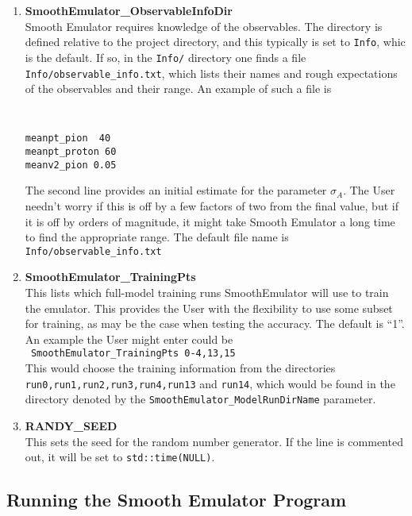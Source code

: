 \documentclass[main.tex]{subfiles}
\begin{document}
\begin{enumerate}
\item {\bf SmoothEmulator\_ObservableInfoDir}\\
Smooth Emulator requires knowledge of the observables. The directory is defined relative to the project directory, and this typically is set to {\tt Info}, whic is the default. If so, in the {\tt Info/} directory one finds a file {\tt Info/observable\_info.txt}, which lists their names and rough expectations of the observables and their range. An example of such a file is
{\tt
\begin{verbatim}
meanpt_pion  40
meanpt_proton 60
meanv2_pion 0.05
\end{verbatim}
}
The second line provides an initial estimate for the parameter $\sigma_A$. The User needn't worry if this is off by a few factors of two from the final value, but if it is off by orders of magnitude, it might take Smooth Emulator a long time to find the appropriate range. The default file name is {\tt Info/observable\_info.txt}
\item {\bf SmoothEmulator\_TrainingPts}\\
This lists which full-model training runs SmoothEmulator will use to train the emulator. This provides the User with the flexibility to use some subset for training, as may be the case when testing the accuracy. The default is ``1''. An example the User might enter could be\\
{\tt ~SmoothEmulator\_TrainingPts  0-4,13,15}\\
This would choose the training information from the directories {\tt run0,run1,run2,run3,run4,run13} and {\tt run14}, which would be found in the directory denoted by the {\tt SmoothEmulator\_ModelRunDirName} parameter.
\item {\bf RANDY\_SEED}\\
This sets the seed for the random number generator. If the line is commented out, it will be set to {\tt std::time(NULL)}.

\end{enumerate}
\subsection{Running the Smooth Emulator Program}
\end{document}
